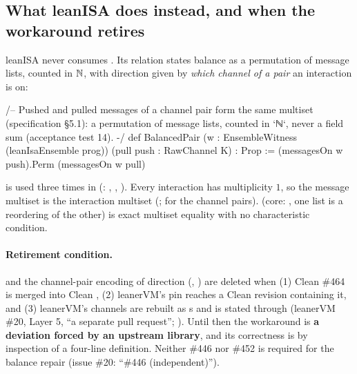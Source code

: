 \subsection{What leanISA does instead, and when the workaround retires}\label{sec:gen-lib-clean-workaround}

leanISA never consumes . Its relation  states balance
as a permutation of message lists, counted in $\mathbb{N}$, with direction given by \emph{which channel
of a pair} an interaction is on:

\begin{leancode}
/-- Pushed and pulled messages of a channel pair form the same multiset (specification §5.1):
a permutation of message lists, counted in `ℕ`, never a field sum (acceptance test 14). -/
def BalancedPair (w : EnsembleWitness (leanIsaEnsemble prog)) (pull push : RawChannel K) :
    Prop :=
  (messagesOn w push).Perm (messagesOn w pull)
\end{leancode}


 is used three times in  (:
, , ). Every interaction has
multiplicity $1$, so the message multiset is the interaction multiset (;
 for the channel pairs).  (core: , one list
is a reordering of the other) is exact multiset equality with no characteristic condition.

\paragraph{Retirement condition.}  and the channel-pair encoding of direction
(, ) are deleted when (1) Clean \#464 is merged into Clean
, (2) leanerVM's pin reaches a Clean revision containing it, and (3) leanerVM's
channels are rebuilt as s and  is stated through
\allowbreak{}\allowbreak{} (leanerVM \#20, Layer 5, \enquote{a separate
pull request}; ). Until then the workaround is \textbf{a deviation
forced by an upstream library}, and its correctness is by inspection of a four-line definition.
Neither \#446 nor \#452 is required for the balance repair (issue \#20: \enquote{\#446
(independent)}).

